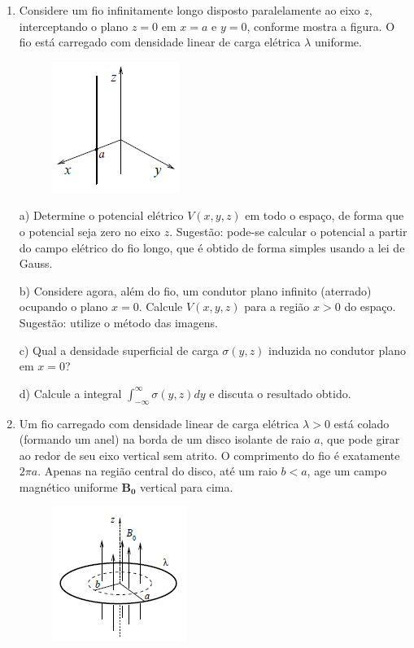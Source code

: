 \begin{enumerate}[start=1,label={\bfseries Q\arabic*.}]
\item Considere um fio infinitamente longo disposto paralelamente ao eixo $z$, interceptando o plano $z = 0$ em $x = a$ e $y = 0$, conforme mostra a figura. O fio está carregado com densidade linear de carga elétrica $\lambda$ uniforme.

\begin{figure}[H]
\centering
\includegraphics[scale=0.8]{eletromag-img/fio.png}
\end{figure}


a) Determine o potencial elétrico $V (x,y,z)$ em todo o espaço, de forma que o potencial seja zero no eixo $z$. Sugestão: pode-se calcular o potencial a partir do campo elétrico do fio longo, que é obtido de forma simples usando a lei de Gauss.

\resposta

b) Considere agora, além do fio, um condutor plano infinito (aterrado) ocupando o plano $x = 0$. Calcule $V (x,y,z)$ para a região $x > 0$ do espaço. Sugestão: utilize o método das imagens.

\resposta

c) Qual a densidade superficial de carga $\sigma(y,z)$ induzida no condutor plano em $x = 0$?

\resposta

d) Calcule a integral $\int_{-\infty}^{\infty} \sigma (y,z) dy$ e discuta o resultado obtido.

\resposta



\item Um fio carregado com densidade linear de carga elétrica $\lambda > 0$ está colado (formando um anel) na borda de um disco isolante de raio $a$, que pode girar ao redor de seu eixo vertical sem atrito. O comprimento do fio é exatamente $2\pi a$. Apenas na região central do disco, até um raio $b < a$, age um campo magnético uniforme $\mathbf{B_{0}}$ vertical para cima.

\begin{figure}[H]
\centering
\includegraphics[scale=0.8]{eletromag-img/fio1.png}
\end{figure}



\end{enumerate}
